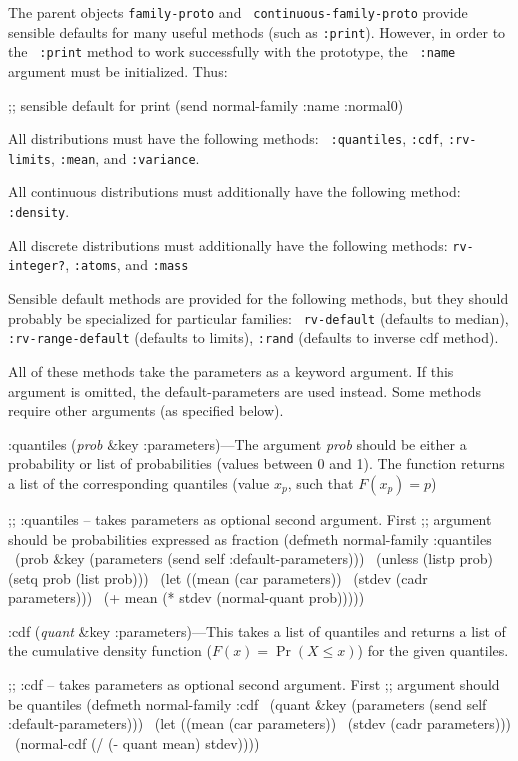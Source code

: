 The parent objects {\tt family-proto\/} and {\tt
continuous-family-proto\/} provide sensible defaults for many useful
methods (such as {\tt :print\/}).  However, in order to the {\tt
:print\/} method to work successfully with the prototype, the {\tt
:name\/} argument must be initialized.  Thus:

\begincode
;; sensible default for print
(send normal-family :name :normal0)
\endcode

All distributions must have the following methods:  {\tt
:quantiles\/}, {\tt :cdf\/}, {\tt :rv-limits\/}, {\tt :mean\/}, and
{\tt :variance\/}.

All continuous distributions must additionally have the following
method: {\tt :density\/}.

All discrete distributions must additionally have the following
methods:  {\tt rv-integer?\/}, {\tt :atoms\/}, and {\tt :mass\/}

Sensible default methods are provided for the following methods, but
they should probably be specialized for particular families:  {\tt
rv-default\/} (defaults to median), {\tt :rv-range-default\/}
(defaults to limits), {\tt :rand\/} (defaults to inverse cdf method).

All of these methods take the \:parameters as a keyword argument.  If
this argument is omitted, the default-parameters are used instead.
Some methods require other arguments (as specified below).



\meth :quantiles ({\it prob} \&key :parameters)---The argument {\it
prob\/} should be either a probability or list of probabilities
(values between 0 and 1).  The function returns a list of the
corresponding quantiles (value $x_p$, such that $F(x_p)=p$)

\begincode
;; :quantiles  -- takes parameters as optional second argument.  First
;; argument should be probabilities expressed as fraction
(defmeth normal-family :quantiles
\         (prob \&key (parameters (send self :default-parameters)))
\  (unless (listp prob) (setq prob (list prob)))
\  (let ((mean (car parameters))
\	(stdev (cadr parameters)))
\    (+ mean (* stdev (normal-quant prob)))))
\endcode
	
\meth :cdf ({\it quant\/} \&key :parameters)---This takes a list of
quantiles and returns a list of the cumulative density function
($F(x)=\Pr(X\leq x)$) for the given quantiles.

\begincode
;; :cdf  -- takes parameters as optional second argument.  First
;; argument should be quantiles
(defmeth normal-family :cdf
\         (quant \&key (parameters (send self :default-parameters)))
\   (let ((mean (car parameters))
\	 (stdev (cadr parameters)))
\     (normal-cdf (/ (- quant mean) stdev))))
\endcode

